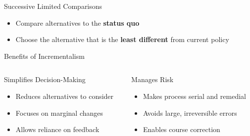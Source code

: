 \documentclass[10pt]{beamer}
\begin{document}
\begin{frame}{Successive Limited Comparisons}
\begin{itemize}
\item Compare alternatives to the \textcolor{titanorange}{\textbf{status quo}}
\item Choose the alternative that is the \textcolor{titanorange}{\textbf{least different}} from current policy
\end{itemize}
\end{frame}

\begin{frame}{Benefits of Incrementalism}
\begin{columns}
\begin{column}{0.5\textwidth}
\begin{block}{Simplifies Decision-Making}
\begin{itemize}
\item Reduces alternatives to consider
\item Focuses on marginal changes
\item Allows reliance on feedback
\end{itemize}
\end{block}
\end{column}
\begin{column}{0.5\textwidth}
\begin{block}{Manages Risk}
\begin{itemize}
\item Makes process serial and remedial
\item Avoids large, irreversible errors
\item Enables course correction
\end{itemize}
\end{block}
\end{column}
\end{columns}
\end{frame}
\end{document}
